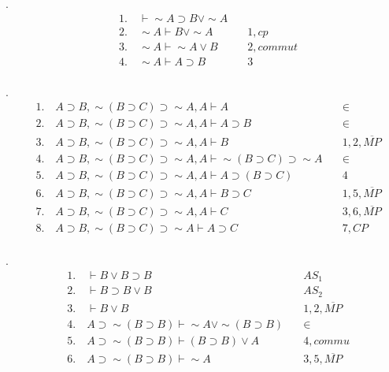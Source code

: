 \documentclass[a4paper]{ctexart}
\begin{document}
.
\begin{align*}
  &1.\quad \vdash \sim A\supset B\vee \sim A \quad &\\
  &2.\quad \sim A \vdash B\vee \sim A \quad& 1,cp \\ 
  &3.\quad \sim A \vdash \sim A \vee B \quad & 2,commut\\ 
  &4.\quad \sim A \vdash A\supset B\quad & 3 \\ 
\end{align*}

.
\begin{align*}
  &1. \quad A\supset B,\sim(B\supset C)\supset \sim A,A \vdash A \quad &\in\\
  &2. \quad A\supset B,\sim(B\supset C)\supset \sim A,A \vdash A\supset B\quad &\in\\
  &3. \quad A\supset B,\sim(B\supset C)\supset \sim A,A \vdash B \quad &1,2,\overline{MP}\\
  &4. \quad A\supset B,\sim(B\supset C)\supset \sim A,A \vdash \sim(B\supset C)\supset \sim A \quad &\in\\
  &5. \quad A\supset B,\sim(B\supset C)\supset \sim A,A \vdash A\supset(B\supset C)\quad &4 \\
  &6. \quad A\supset B,\sim(B\supset C)\supset \sim A,A \vdash B\supset C\quad &1,5,\overline{MP} \\
  &7. \quad A\supset B,\sim(B\supset C)\supset \sim A,A \vdash C\quad &3,6,\overline{MP} \\
  &8. \quad A\supset B,\sim(B\supset C)\supset \sim A \vdash A\supset C\quad &7,CP \\
\end{align*}

.
\begin{align*}
  &1. \quad  \vdash B\vee B\supset B \quad &AS_1 \\
  &2. \quad  \vdash B\supset B\vee B \quad &AS_2 \\
  &3. \quad  \vdash B\vee B \quad &1,2,\overline{MP} \\
  &4. \quad  A\supset\sim(B\supset B)\vdash \sim A \vee \sim(B\supset B)\quad &\in \\
  &5. \quad  A\supset\sim(B\supset B)\vdash (B\supset B)\vee A \quad &4, commu \\
  &6. \quad  A\supset\sim(B\supset B)\vdash \sim A \quad &3,5,\overline{MP} \\
\end{align*}
\end{document}
